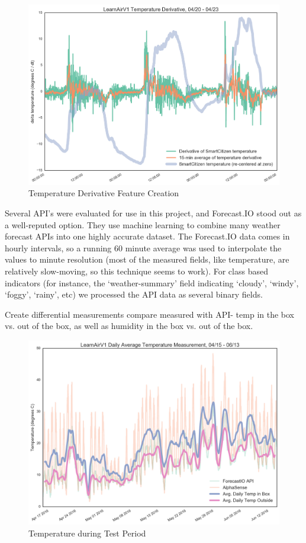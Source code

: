 \begin{figure}[htb]
 	\includegraphics[width=\textwidth]{figs/temp_derivative}               
 	 \caption{Temperature Derivative Feature Creation}
  	\label{fig:temp_derivative}
\end{figure}



Several API's were evaluated for use in this project, and Forecast.IO stood out as a well-reputed option.  They use machine learning to combine many weather forecast APIs into one highly accurate dataset.  The Forecast.IO data comes in hourly intervals, so a running 60 minute average was used to interpolate the values to minute resolution (most of the measured fields, like temperature, are relatively slow-moving, so this technique seems to work).  For class based indicators (for instance, the `weather-summary' field indicating `cloudy', `windy', `foggy', `rainy', etc) we processed the API data as several binary fields.   

Create differential measurements compare measured with API- temp in the box vs. out of the box, as well as humidity in the box vs. out of the box.

\begin{figure}[htb]
 	\includegraphics[width=\textwidth]{figs/temp_daily}               
 	 \caption{Temperature during Test Period}
  	\label{fig:temp_daily}
\end{figure}

